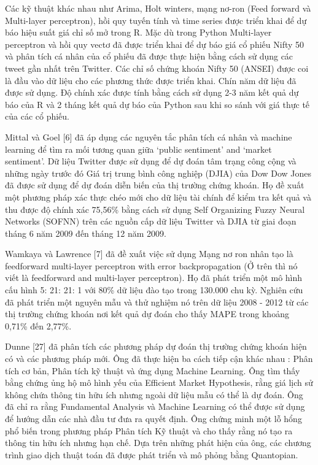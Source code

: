 Các kỹ thuật khác nhau như Arima, Holt winters, mạng nơ-ron (Feed forward và Multi-layer perceptron), hồi quy tuyến tính và time series được triển khai để dự báo hiệu suất giá chỉ số mở trong R. Mặc dù trong Python Multi-layer perceptron và hồi quy vectơ đã được triển khai để dự báo giá cổ phiếu Nifty 50 và phân tích cá nhân của cổ phiếu đã được thực hiện bằng cách sử dụng các tweet gần nhất trên Twitter. Các chỉ số chứng khoán Nifty 50 (ANSEI) được coi là đầu vào dữ liệu cho các phương thức được triển khai. Chín năm dữ liệu đã được sử dụng. Độ chính xác được tính bằng cách sử dụng 2-3 năm kết quả dự báo của R và 2 tháng kết quả dự báo của Python sau khi so sánh với giá thực tế của các cổ phiếu.

Mittal và Goel [6] đã áp dụng các nguyên tắc phân tích cá nhân và machine learning để tìm ra mối tương quan giữa ‘public sentiment’ and ‘market sentiment’. Dữ liệu Twitter được sử dụng để dự đoán tâm trạng công cộng và những ngày trước đó Giá trị trung bình công nghiệp (DJIA) của Dow Dow Jones đã được sử dụng để dự đoán diễn biến của thị trường chứng khoán. Họ đề xuất một phương pháp xác thực chéo mới cho dữ liệu tài chính để kiểm tra kết quả và thu được độ chính xác 75,56\% bằng cách sử dụng Self Organizing Fuzzy Neural Networks (SOFNN) trên các nguồn cấp dữ liệu Twitter và DJIA từ giai đoạn tháng 6 năm 2009 đến tháng 12 năm 2009.

Wamkaya và Lawrence [7] đã đề xuất việc sử dụng Mạng nơ ron nhân tạo là feedforward multi-layer perceptron with error backpropagation (Ở trên thì nó viết là feedforward and multi-layer perceptron). Họ đã phát triển một mô hình cấu hình 5: 21: 21: 1 với 80\% dữ liệu đào tạo trong 130.000 chu kỳ. Nghiên cứu đã phát triển một nguyên mẫu và thử nghiệm nó trên dữ liệu 2008 - 2012 từ các thị trường chứng khoán nơi kết quả dự đoán cho thấy MAPE trong khoảng 0,71\% đến 2,77\%.

Dunne [27] đã phân tích các phương pháp dự đoán thị trường chứng khoán hiện có và các phương pháp mới. Ông đã thực hiện ba cách tiếp cận khác nhau : Phân tích cơ bản, Phân tích kỹ thuật và ứng dụng Machine Learning. Ông tìm thấy bằng chứng ủng hộ mô hình yếu của Efficient Market Hypothesis, rằng giá lịch sử không chứa thông tin hữu ích nhưng ngoài dữ liệu mẫu có thể là dự đoán. Ông đã chỉ ra rằng Fundamental Analysis và Machine Learning có thể được sử dụng để hướng dẫn các nhà đầu tư đưa ra quyết định. Ông chứng minh một lỗ hổng phổ biến trong phương pháp Phân tích Kỹ thuật và cho thấy rằng nó tạo ra thông tin hữu ích nhưng hạn chế. Dựa trên những phát hiện của ông, các chương trình giao dịch thuật toán đã được phát triển và mô phỏng bằng Quantopian.

